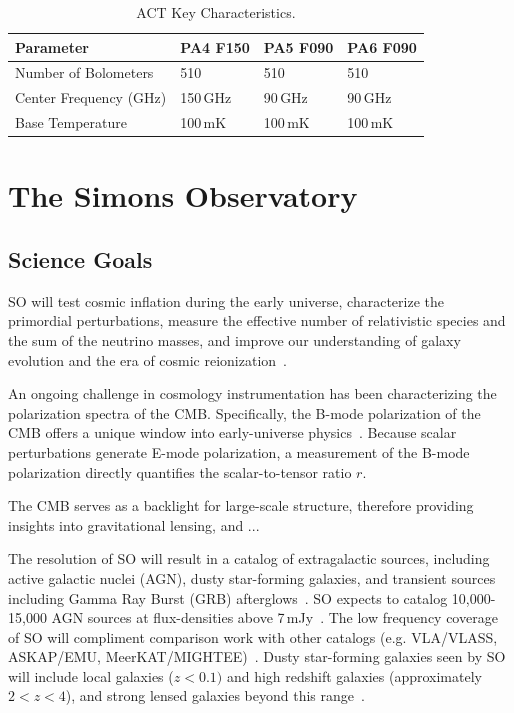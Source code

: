 \begin{table}[t]
    \centering
    \begin{tabular}{|l|l|l|l|} \hline
        \textbf{ Parameter} &  \textbf{PA4 F150} &  \textbf{PA5 F090}  &  \textbf{PA6 F090}  \\ \hline \hline
        Number of Bolometers & 510 & 510 & 510\\\hline
        Center Frequency (GHz) & 150\,GHz & 90\,GHz & 90\,GHz\\\hline
        Base Temperature & 100\,mK & 100\,mK & 100\,mK\\\hline
    \end{tabular} \caption{ACT Key Characteristics.}
    \label{tab:act}
\end{table}

\section{The Simons Observatory}

\subsection{Science Goals}

SO will test cosmic inflation during the early universe, characterize the primordial perturbations, measure the effective number of relativistic species and the sum of the neutrino masses, and improve our understanding of galaxy evolution and the era of cosmic reionization~\citep{so19,so_science}. 

An ongoing challenge in cosmology instrumentation has been characterizing the polarization spectra of the CMB.  Specifically, the B-mode polarization of the CMB offers a unique window into early-universe physics~\cite{}.  Because scalar perturbations generate E-mode polarization, a measurement of the B-mode polarization directly quantifies the scalar-to-tensor ratio $r$.

The CMB serves as a backlight for large-scale structure, therefore providing insights into gravitational lensing, and ...

The resolution of SO will result in a catalog of extragalactic sources, including active galactic nuclei (AGN), dusty star-forming galaxies, and transient sources including Gamma Ray Burst (GRB) afterglows~\cite{so_science}.  SO expects to catalog 10,000-15,000 AGN sources at flux-densities above 7\,mJy~\cite{Tucci_2011}.  The low frequency coverage of SO will compliment comparison work with other catalogs (e.g. VLA/VLASS, ASKAP/EMU, MeerKAT/MIGHTEE)~\cite{so_science}.  Dusty star-forming galaxies seen by SO will include local galaxies ($z<0.1)$ and high redshift galaxies (approximately $2<z<4$), and strong lensed galaxies beyond this range~\cite{Marrone_2017}.

